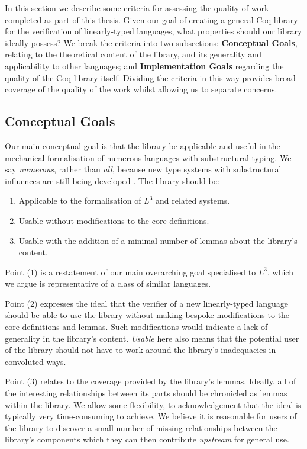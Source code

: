 \documentclass[]{unswthesis}
\let\i\textit
\let\b\textbf
\begin{document}
In this section we describe some criteria for assessing the quality of work completed as part of this thesis. Given our goal of creating a general Coq library for the verification of linearly-typed languages, what properties should our library ideally possess? We break the criteria into two subsections: \b{Conceptual Goals}, relating to the theoretical content of the library, and its generality and applicability to other languages; and \b{Implementation Goals} regarding the quality of the Coq library itself. Dividing the criteria in this way provides broad coverage of the quality of the work whilst allowing us to separate concerns.

\subsection{Conceptual Goals}

Our main conceptual goal is that the library be applicable and useful in the mechanical formalisation of numerous languages with substructural typing. We say \i{numerous}, rather than \i{all}, because new type systems with substructural influences are still being developed \cite{mcbride16}. The library should be:

\begin{enumerate}
\item Applicable to the formalisation of $L^3$ and related systems.
\item Usable without modifications to the core definitions.
\item Usable with the addition of a minimal number of lemmas about the library's content.
\end{enumerate}

Point (1) is a restatement of our main overarching goal specialised to $L^3$, which we argue is representative of a class of similar languages.

Point (2) expresses the ideal that the verifier of a new linearly-typed language should be able to use the library without making bespoke modifications to the core definitions and lemmas. Such modifications would indicate a lack of generality in the library's content. \i{Usable} here also means that the potential user of the library should not have to work around the library's inadequacies in convoluted ways.

Point (3) relates to the coverage provided by the library's lemmas. Ideally, all of the interesting relationships between its parts should be chronicled as lemmas within the library. We allow some flexibility, to acknowledgement that the ideal is typically very time-consuming to achieve. We believe it is reasonable for users of the library to discover a small number of missing relationships between the library's components which they can then contribute \i{upstream} for general use.
\end{document}

